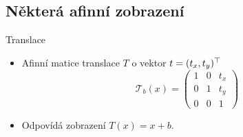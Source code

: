 \subsection{Některá afinní zobrazení}
\begin{frame}[t]{Translace}
    \begin{itemize}
        \item Afinní matice translace $T$ o vektor $t=(t_x,t_y)^\top$
        \[\mathcal{T}_b(x)=\left(\begin{matrix}
            1 & 0 & t_x\\
            0 & 1 & t_y\\
            0 & 0 & 1
        \end{matrix}\right)\]
        \item Odpovídá zobrazení $T(x)=x+b$.
    \end{itemize}
\end{frame}